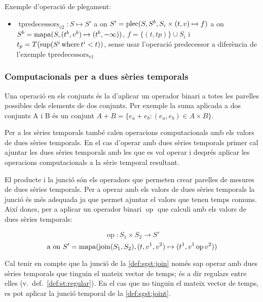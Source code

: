 Exemple d'operació de plegament:
\begin{itemize}
\item $\operatorname{tpredecessors}_{v2}: S \mapsto S'$ a on $S'=
  \operatorname*{plec}(S,S^b,S_i\times (t,v) \mapsto f)$ a on $S^b =
  \operatorname*{mapa}(S,(t^b,v^b)\mapsto(t^b,-\infty))$, $f= \{(t,tp)\} \cup S_i$ i
  $t_p=T(\sup(S^i \operatorname*{where} t^i < t))$, sense usar l'operació predecessor
  a diferència de l'exemple $\operatorname{tpredecessors_{v1}}$
\end{itemize}




\subsubsection{Computacionals per a dues sèries temporals}

Una operació en els conjunts és la d'aplicar un operador binari a
totes les parelles possibles dels elements de dos conjunts. Per
exemple la suma aplicada a dos conjunts A i B és un conjunt $A + B =
\{ e_a+e_b : (e_a,e_b) \in A\times B \}$.

Per a les sèries temporals també calen operacions computacionals amb
els valors de dues sèries temporals. En el cas d'operar amb dues
sèries temporals primer cal ajuntar les dues sèries temporals amb les
que es vol operar i després aplicar les operacions computacionals a la
sèrie temporal resultant.


El producte i la junció són els operadors que permeten crear parelles
de mesures de dues sèries temporals. Per a operar amb els valors de
dues sèries temporals la junció és més adequada ja que permet ajuntar
el valors que tenen temps comuns. Així doncs, per a aplicar un
operador binari $\operatorname{op}$ que calculi amb els valors de
dues sèries temporals:

\[
\operatorname{op}: S_1 \times S_2 \longrightarrow S'
\]
\[
\text{a on } S' = \operatorname*{mapa}(\operatorname*{join}(S_1,S_2),(t,v^1,v^2)\mapsto(t^1,v^1
\operatorname{op} v^2))
\]

Cal tenir en compte que la junció de la \autoref{def:sgst:join} només
sap operar amb dues sèries temporals que tinguin el mateix vector de
temps; és a dir regulars entre elles (v.\
def.~\ref{def:st:regular}). En el cas que no tinguin el mateix vector
de temps, es pot aplicar la junció temporal de la
\autoref{def:sgst:joint}.



